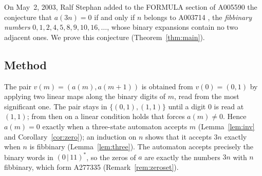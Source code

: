 \documentclass[11pt]{amsart}
\theoremstyle{plain}
\theoremstyle{definition}
\begin{document}
On May~2, 2003, Ralf Stephan added to the FORMULA section of A005590 the conjecture that $a(3n)=0$ if and only if $n$ belongs to A003714 \cite{A003714}, the \emph{fibbinary numbers} $0,1,2,4,5,8,9,10,16,\dots$, whose binary expansions contain no two adjacent ones.
We prove this conjecture (Theorem~\ref{thm:main}).

\subsection*{Method}
The pair $v(m)=(a(m),a(m+1))$ is obtained from $v(0)=(0,1)$ by applying two linear maps along the binary digits of $m$, read from the most significant one.
The pair stays in $\{(0,1),(1,1)\}$ until a digit $0$ is read at $(1,1)$; from then on a linear condition holds that forces $a(m)\ne0$.
Hence $a(m)=0$ exactly when a three-state automaton accepts $m$ (Lemma~\ref{lem:inv} and Corollary~\ref{cor:zero}); an induction on $n$ shows that it accepts $3n$ exactly when $n$ is fibbinary (Lemma~\ref{lem:three}).
The automaton accepts precisely the binary words in $(0\,|\,11)^*$, so the zeros of $a$ are exactly the numbers $3n$ with $n$ fibbinary, which form A277335 \cite{A277335} (Remark~\ref{rem:zeroset}).
\end{document}
